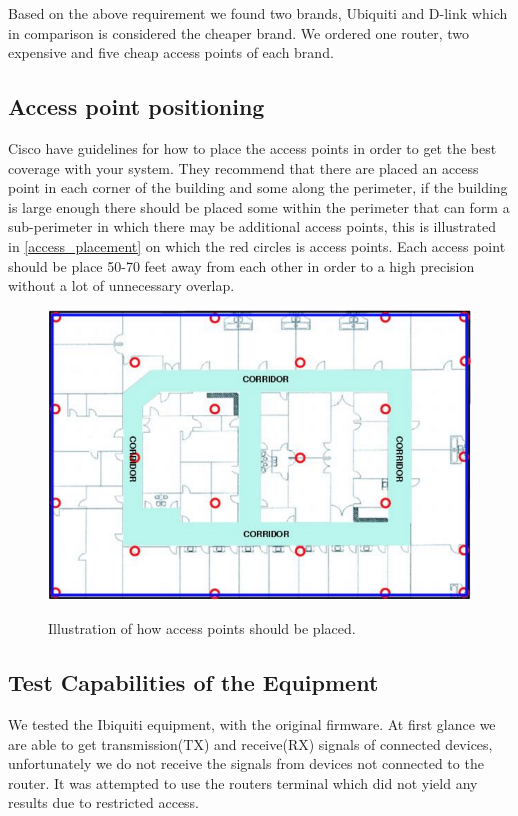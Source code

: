 Based on the above requirement we found two brands, Ubiquiti and D-link which in comparison is considered the cheaper brand. We ordered one router, two expensive and five cheap access points of each brand.

\subsection*{Access point positioning}
Cisco\cite{access_point_placement} have guidelines for how to place the access points in order to get the best coverage with your system. They recommend that there are placed an access point in each corner of the building and some along the perimeter, if the building is large enough there should be placed some within the perimeter that can form a sub-perimeter in which there may be additional access points, this is illustrated in \cref{access_placement} on which the red circles is access points. Each access point should be place 50-70 feet away from each other in order to a high precision without a lot of unnecessary overlap\cite{access_point_range}.

\begin{figure}[H]
	\centering
	\includegraphics[scale=0.5]{graphics/access_placement.png}
	\label{fig:access_placement}
	\caption{Illustration of how access points should be placed.}
\end{figure}

\subsection*{Test Capabilities of the Equipment}
We tested the Ibiquiti equipment, with the original firmware. At first glance we are able to get transmission(TX) and receive(RX) signals of connected devices, unfortunately we do not receive the signals from devices not connected to the router. It was attempted to use the routers terminal which did not yield any results due to restricted access.

